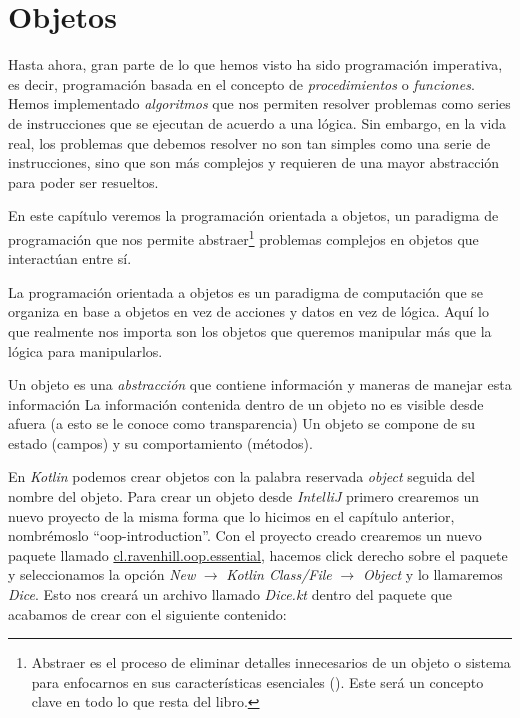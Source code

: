 \section{Objetos}
  Hasta ahora, gran parte de lo que hemos visto ha sido programación imperativa, es decir,
  programación basada en el concepto de \textit{procedimientos} o \textit{funciones}.
  Hemos implementado \textit{algoritmos} que nos permiten resolver problemas como series de
  instrucciones que se ejecutan de acuerdo a una lógica.
  Sin embargo, en la vida real, los problemas que debemos resolver no son tan simples como
  una serie de instrucciones, sino que son más complejos y requieren de una mayor abstracción
  para poder ser resueltos.

  En este capítulo veremos la programación orientada a objetos, un paradigma de programación
  que nos permite abstraer\footnote{
    Abstraer es el proceso de eliminar detalles innecesarios de un objeto o sistema para 
    enfocarnos en sus características esenciales (\cite{ObjectorientedProgramming2023}).
    Este será un concepto clave en todo lo que resta del libro.
  } problemas complejos en objetos que interactúan entre sí.

  \begin{defaultbox}
    La programación orientada a objetos es un paradigma de computación que se organiza en base a 
    objetos en vez de acciones y datos en vez de lógica.
    Aquí lo que realmente nos importa son los objetos que queremos manipular más que la lógica para
    manipularlos.
  \end{defaultbox}
  
  Un objeto es una \textit{abstracción} que contiene información y maneras de manejar esta información
  La información contenida dentro de un objeto no es visible desde afuera (a esto se le conoce como transparencia)
  Un objeto se compone de su estado (campos) y su comportamiento (métodos).

  En \textit{Kotlin} podemos crear objetos con la palabra reservada \textit{object} seguida del 
  nombre del objeto.
  Para crear un objeto desde \textit{IntelliJ} primero crearemos un nuevo proyecto de la misma forma
  que lo hicimos en el capítulo anterior, nombrémoslo \enquote{oop-introduction}.
  Con el proyecto creado crearemos un nuevo paquete llamado \url{cl.ravenhill.oop.essential}, 
  hacemos click derecho sobre el paquete y seleccionamos la opción \textit{New} \(\rightarrow\) 
  \textit{Kotlin Class/File} \(\rightarrow\) \textit{Object} y lo llamaremos \textit{Dice}.
  Esto nos creará un archivo llamado \textit{Dice.kt} dentro del paquete que acabamos de crear con
  el siguiente contenido:

